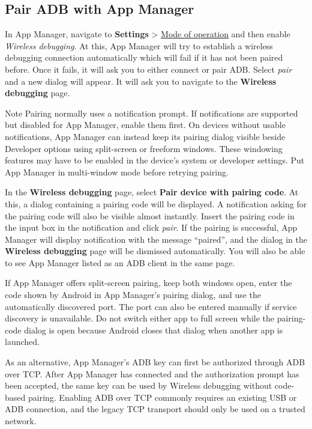 \subsection{Pair ADB with App Manager}\label{subsec:pair-adb-with-app-manager} %
In App Manager, navigate to \textbf{Settings} > \hyperref[subsec:mode-of-operation]{Mode of operation}
and then enable \textit{Wireless debugging}. At this, App Manager will try to establish a wireless
debugging connection automatically which will fail if it has not been paired before. Once it fails,
it will ask you to either connect or pair ADB\@. Select \textit{pair} and a new dialog will appear.
It will ask you to navigate to the \textbf{Wireless debugging} page.

\begin{tip}{Note}
    Pairing normally uses a notification prompt. If notifications are supported but disabled for
    App Manager, enable them first. On devices without usable notifications, App Manager can instead
    keep its pairing dialog visible beside Developer options using split-screen or freeform windows.
    These windowing features may have to be enabled in the device's system or developer settings.
    Put App Manager in multi-window mode before retrying pairing.
\end{tip}

In the \textbf{Wireless debugging} page, select \textbf{Pair device with pairing code}. At this, a
dialog containing a pairing code will be displayed. A notification asking for the pairing code will
also be visible almost instantly. Insert the pairing code in the input box in the notification
and click \textit{pair}. If the pairing is successful, App Manager will display notification with
the message ``paired'', and the dialog in the \textbf{Wireless debugging} page will be dismissed
automatically. You will also be able to see App Manager listed as an ADB client in the same page.

If App Manager offers split-screen pairing, keep both windows open, enter the code shown by Android
in App Manager's pairing dialog, and use the automatically discovered port. The port can also be
entered manually if service discovery is unavailable. Do not switch either app to full screen while
the pairing-code dialog is open because Android closes that dialog when another app is launched.

As an alternative, App Manager's ADB key can first be authorized through ADB over TCP. After App
Manager has connected and the authorization prompt has been accepted, the same key can be used by
Wireless debugging without code-based pairing. Enabling ADB over TCP commonly requires an existing
USB or ADB connection, and the legacy TCP transport should only be used on a trusted network.

